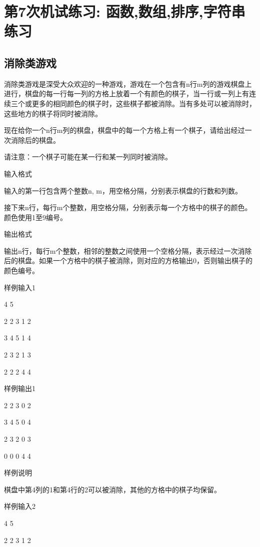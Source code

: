 %
%
%
\chapter{第7次机试练习: 函数,数组,排序,字符串练习}

\section{消除类游戏}
消除类游戏是深受大众欢迎的一种游戏，游戏在一个包含有n行m列的游戏棋盘上进行，棋盘的每一行每一列的方格上放着一个有颜色的棋子，当一行或一列上有连续三个或更多的相同颜色的棋子时，这些棋子都被消除。当有多处可以被消除时，这些地方的棋子将同时被消除。

现在给你一个n行m列的棋盘，棋盘中的每一个方格上有一个棋子，请给出经过一次消除后的棋盘。

请注意：一个棋子可能在某一行和某一列同时被消除。

输入格式

输入的第一行包含两个整数n, m，用空格分隔，分别表示棋盘的行数和列数。

接下来n行，每行m个整数，用空格分隔，分别表示每一个方格中的棋子的颜色。颜色使用1至9编号。

输出格式

输出n行，每行m个整数，相邻的整数之间使用一个空格分隔，表示经过一次消除后的棋盘。如果一个方格中的棋子被消除，则对应的方格输出0，否则输出棋子的颜色编号。

样例输入1

4 5

2 2 3 1 2

3 4 5 1 4

2 3 2 1 3

2 2 2 4 4

样例输出1

2 2 3 0 2

3 4 5 0 4

2 3 2 0 3

0 0 0 4 4

样例说明

棋盘中第4列的1和第4行的2可以被消除，其他的方格中的棋子均保留。

样例输入2

4 5

2 2 3 1 2

